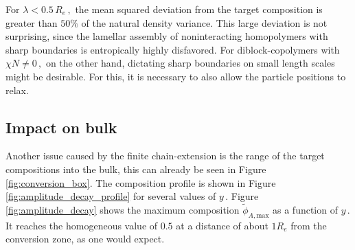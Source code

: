 \documentclass[bachelor,       %
               twoside,        %
               BCOR10mm,       %
               ngerman, english %
               ]{GAUBM}
\begin{document}
For $\lambda<0.5\,R_e\,,$ the mean squared deviation from the target composition is greater than $50\%$ of the natural density variance. This large deviation is not surprising, since the lamellar assembly of noninteracting homopolymers with sharp boundaries is entropically highly disfavored. For diblock-copolymers with $\chi N\neq 0\,,$ on the other hand, dictating sharp boundaries on small length scales might be desirable. For this, it is necessary to also allow the particle positions to relax.

\subsection{Impact on bulk}

Another issue caused by the finite chain-extension is the range of the target compositions into the bulk, this can already be seen in Figure \ref{fig:conversion_box}. The composition profile is shown in Figure \ref{fig:amplitude_decay_profile} for several values of $y\,.$ Figure \ref{fig:amplitude_decay} shows the maximum composition $\tilde\phi_{A,\mathrm{max}}$ as a function of $y\,.$ It reaches the homogeneous value of $0.5$ at a distance of about $1R_e$ from the conversion zone, as one would expect. 
\end{document}
